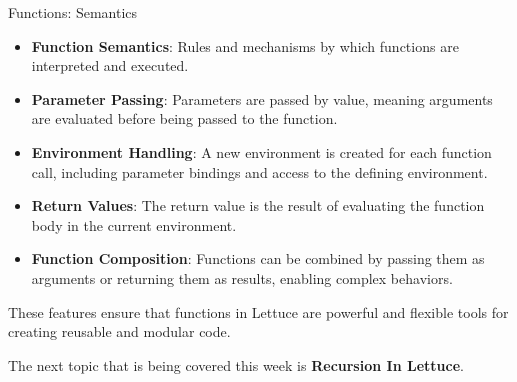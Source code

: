 \begin{notes}{Functions: Semantics}
\begin{highlight}
        \begin{itemize}
            \item \textbf{Function Semantics}: Rules and mechanisms by which functions are interpreted and executed.
            \item \textbf{Parameter Passing}: Parameters are passed by value, meaning arguments are evaluated before being passed to the function.
            \item \textbf{Environment Handling}: A new environment is created for each function call, including parameter bindings and access to the defining environment.
            \item \textbf{Return Values}: The return value is the result of evaluating the function body in the current environment.
            \item \textbf{Function Composition}: Functions can be combined by passing them as arguments or returning them as results, enabling complex behaviors.
        \end{itemize}
    
        These features ensure that functions in Lettuce are powerful and flexible tools for creating reusable and modular code.
    
    \end{highlight}
\end{notes}

The next topic that is being covered this week is \textbf{Recursion In Lettuce}.

